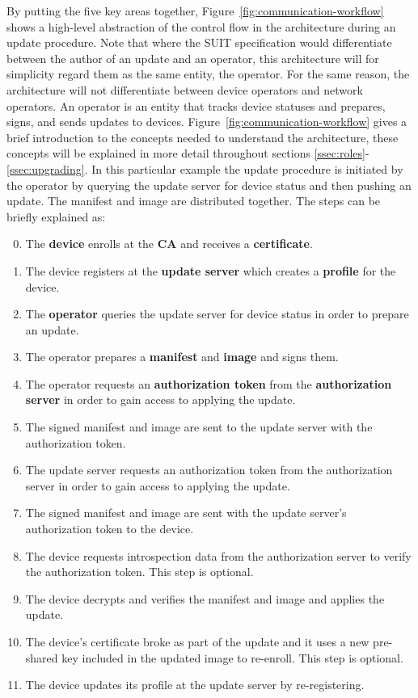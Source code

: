 \documentclass[0-thesis.tex]{subfiles}
\begin{document}
By putting the five key areas together, Figure~\ref{fig:communication-workflow} shows a
high-level abstraction of the control flow in the architecture during an update procedure.
Note that where the SUIT specification would differentiate between the author of an update
and an operator, this architecture will for simplicity regard them as the same entity, the
operator. For the same reason, the architecture will not differentiate between device
operators and network operators. An operator is an entity that tracks device statuses and
prepares, signs, and sends updates to devices. Figure~\ref{fig:communication-workflow}
gives a brief introduction to the concepts needed to understand the architecture, these
concepts will be explained in more detail throughout sections
\ref{ssec:roles}-\ref{ssec:upgrading}. In this particular example the update procedure is
initiated by the operator by querying the update server for device status and then pushing
an update. The manifest and image are distributed together. The steps can be briefly
explained as:

\begin{enumerate}
    \setcounter{enumi}{-1}
    \item The \textbf{device} enrolls at the \textbf{CA} and receives a
            \textbf{certificate}.
    \item The device registers at the \textbf{update server} which creates a \textbf{profile}
            for the device.
    \item The \textbf{operator} queries the update server for device status in order to
            prepare an update.
    \item The operator prepares a \textbf{manifest} and \textbf{image} and signs them.
    \item The operator requests an \textbf{authorization token} from the
            \textbf{authorization server} in order to gain access to applying the update.
    \item The signed manifest and image are sent to the update server with the
            authorization token.
    \item The update server requests an authorization token from the authorization server
            in order to gain access to applying the update.
    \item The signed manifest and image are sent with the update server's authorization
            token to the device.
    \item The device requests introspection data from the authorization server to verify
            the authorization token. This step is optional.
    \item The device decrypts and verifies the manifest and image and applies the update.
    \item The device's certificate broke as part of the update and it uses a new
            pre-shared key included in the updated image to re-enroll. This step is
            optional.
    \item The device updates its profile at the update server by re-registering.
\end{enumerate}
\end{document}
